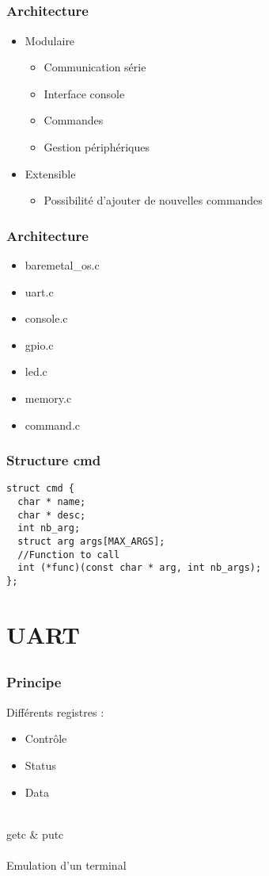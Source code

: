 \documentclass{beamer}
\begin{document}
\subsection{ }

\begin{frame}
\frametitle{Architecture}
\begin{itemize}
\item Modulaire
    \begin{itemize}
	\item Communication série
	\item Interface console
	\item Commandes
	\item Gestion périphériques
    \end{itemize}
\item Extensible
    \begin{itemize}
	\item Possibilité d'ajouter de nouvelles commandes
    \end{itemize}
\end{itemize}
\end{frame}

\begin{frame}
\frametitle{Architecture}
\begin{itemize}
\item baremetal\_os.c
\item uart.c
\item console.c
\item gpio.c
\item led.c
\item memory.c
\item command.c
\end{itemize}
\end{frame}

\begin{frame}[fragile]
\frametitle{Structure cmd}
\begin{lstlisting}
struct cmd {
  char * name;
  char * desc;
  int nb_arg;
  struct arg args[MAX_ARGS];
  //Function to call
  int (*func)(const char * arg, int nb_args);
};
\end{lstlisting}
\end{frame}

\section{UART}
\subsection{}
\begin{frame}
  \frametitle{Principe}
  Différents registres :
  \begin{itemize}
    \item Contrôle
    \item Status
    \item Data
  \end{itemize}~\\
  \textsf{getc} \& \textsf{putc} \\~\\
  Emulation d'un terminal
\end{frame}
\end{document}
